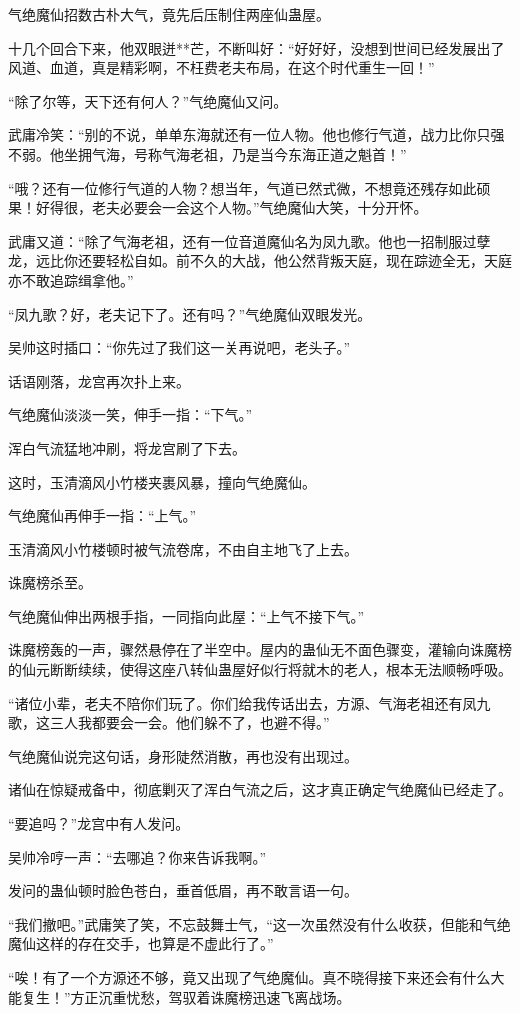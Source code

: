 \begin{this_body}
气绝魔仙招数古朴大气，竟先后压制住两座仙蛊屋。

十几个回合下来，他双眼迸**芒，不断叫好：“好好好，没想到世间已经发展出了风道、血道，真是精彩啊，不枉费老夫布局，在这个时代重生一回！”

“除了尔等，天下还有何人？”气绝魔仙又问。

武庸冷笑：“别的不说，单单东海就还有一位人物。他也修行气道，战力比你只强不弱。他坐拥气海，号称气海老祖，乃是当今东海正道之魁首！”

“哦？还有一位修行气道的人物？想当年，气道已然式微，不想竟还残存如此硕果！好得很，老夫必要会一会这个人物。”气绝魔仙大笑，十分开怀。

武庸又道：“除了气海老祖，还有一位音道魔仙名为凤九歌。他也一招制服过孽龙，远比你还要轻松自如。前不久的大战，他公然背叛天庭，现在踪迹全无，天庭亦不敢追踪缉拿他。”

“凤九歌？好，老夫记下了。还有吗？”气绝魔仙双眼发光。

吴帅这时插口：“你先过了我们这一关再说吧，老头子。”

话语刚落，龙宫再次扑上来。

气绝魔仙淡淡一笑，伸手一指：“下气。”

浑白气流猛地冲刷，将龙宫刷了下去。

这时，玉清滴风小竹楼夹裹风暴，撞向气绝魔仙。

气绝魔仙再伸手一指：“上气。”

玉清滴风小竹楼顿时被气流卷席，不由自主地飞了上去。

诛魔榜杀至。

气绝魔仙伸出两根手指，一同指向此屋：“上气不接下气。”

诛魔榜轰的一声，骤然悬停在了半空中。屋内的蛊仙无不面色骤变，灌输向诛魔榜的仙元断断续续，使得这座八转仙蛊屋好似行将就木的老人，根本无法顺畅呼吸。

“诸位小辈，老夫不陪你们玩了。你们给我传话出去，方源、气海老祖还有凤九歌，这三人我都要会一会。他们躲不了，也避不得。”

气绝魔仙说完这句话，身形陡然消散，再也没有出现过。

诸仙在惊疑戒备中，彻底剿灭了浑白气流之后，这才真正确定气绝魔仙已经走了。

“要追吗？”龙宫中有人发问。

吴帅冷哼一声：“去哪追？你来告诉我啊。”

发问的蛊仙顿时脸色苍白，垂首低眉，再不敢言语一句。

“我们撤吧。”武庸笑了笑，不忘鼓舞士气，“这一次虽然没有什么收获，但能和气绝魔仙这样的存在交手，也算是不虚此行了。”

“唉！有了一个方源还不够，竟又出现了气绝魔仙。真不晓得接下来还会有什么大能复生！”方正沉重忧愁，驾驭着诛魔榜迅速飞离战场。

\end{this_body}

